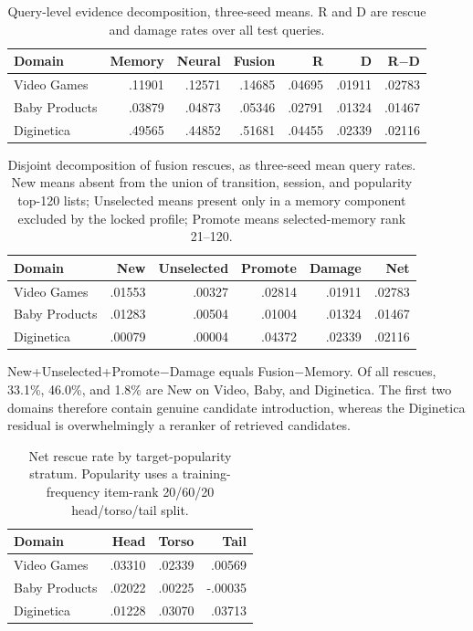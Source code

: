 \documentclass[runningheads]{llncs}
\begin{document}
\begin{table}[H]
\caption{Query-level evidence decomposition, three-seed means. R and D are
rescue and damage rates over all test queries.}
\centering\small
\begin{tabular}{lrrrrrr}
\toprule
Domain & Memory & Neural & Fusion & R & D & R$-$D\\
\midrule
Video Games & .11901 & .12571 & .14685 & .04695 & .01911 & .02783\\
Baby Products & .03879 & .04873 & .05346 & .02791 & .01324 & .01467\\
Diginetica & .49565 & .44852 & .51681 & .04455 & .02339 & .02116\\
\bottomrule
\end{tabular}
\end{table}

\begin{table}[H]
\caption{Disjoint decomposition of fusion rescues, as three-seed mean query
rates. New means absent from the union of transition, session, and popularity
top-120 lists; Unselected means present only in a memory component excluded by
the locked profile; Promote means selected-memory rank 21--120.}
\centering\small
\begin{tabular}{lrrrrr}
\toprule
Domain & New & Unselected & Promote & Damage & Net\\
\midrule
Video Games & .01553 & .00327 & .02814 & .01911 & .02783\\
Baby Products & .01283 & .00504 & .01004 & .01324 & .01467\\
Diginetica & .00079 & .00004 & .04372 & .02339 & .02116\\
\bottomrule
\end{tabular}
\end{table}
New+Unselected+Promote$-$Damage equals Fusion$-$Memory. Of all rescues,
33.1\%, 46.0\%, and 1.8\% are New on Video, Baby, and Diginetica. The first
two domains therefore contain genuine candidate introduction, whereas the
Diginetica residual is overwhelmingly a reranker of retrieved candidates.

\clearpage
\begin{table}[H]
\caption{Net rescue rate by target-popularity stratum. Popularity uses a
training-frequency item-rank 20/60/20 head/torso/tail split.}
\centering\small
\begin{tabular}{lrrr}
\toprule
Domain & Head & Torso & Tail\\
\midrule
Video Games & .03310 & .02339 & .00569\\
Baby Products & .02022 & .00225 & -.00035\\
Diginetica & .01228 & .03070 & .03713\\
\bottomrule
\end{tabular}
\end{table}
\end{document}
